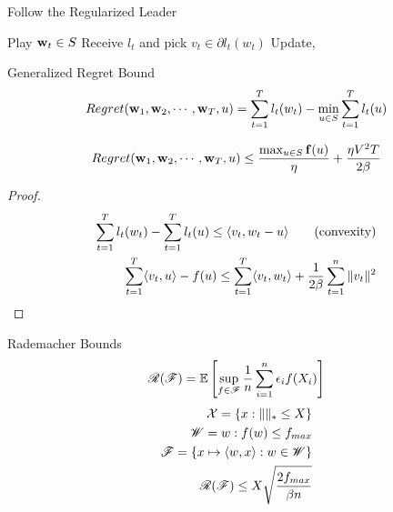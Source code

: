 \begin{frame}{Follow the Regularized Leader}
  \begin{algorithmic}
    \State Play $\operatorname{\mathbf{w}}_t \in S$
    \State Receive $l_t$ and pick $v_t \in \partial l_t(w_t)$
    \State Update,
    \EndFor
  \end{algorithmic}
\end{frame}

\begin{frame}{Generalized Regret Bound}
  \begin{align*}
    Regret(\operatorname{\mathbf{w}}_1,\operatorname{\mathbf{w}}_2,\cdots,\operatorname{\mathbf{w}}_T,u) = \sum_{t=1}^T l_t(w_t) - \min_{u \in S} \sum_{t=1}^T l_t(u)
  \end{align*}
  \begin{theorem}
    \begin{align*}    
      Regret(\operatorname{\mathbf{w}}_1,\operatorname{\mathbf{w}}_2,\cdots,\operatorname{\mathbf{w}}_T,u) \le \frac{\max_{u \in S} \operatorname{\mathbf{f}}(u)}{\eta} + \frac{\eta V^2T}{2\beta}
    \end{align*}  
  \end{theorem}
\end{frame}

\begin{frame}
  \begin{proof}
    \begin{align*}    
      \sum_{t=1}^T l_t(w_t) - \sum_{t=1}^T l_t(u) \le \langle {v_t} , {w_t - u} \rangle \tag{convexity} \\
      \sum_{t=1}^T \langle {v_t} , {u} \rangle -f(u) \le \sum_{t=1}^T \langle {v_t} , {w_t} \rangle +\frac{1}{2\beta} \sum_{t=1}^n \|v_t\|^2 \\
    \end{align*}  
  \end{proof}
\end{frame}

\begin{frame}{Rademacher Bounds}
  \begin{align*}
    \operatorname{\mathscr{R}}(\operatorname{\mathscr{F}}) = \operatorname{\mathbb{E}} \left[ \sup_{f \in \operatorname{\mathscr{F}}} \frac{1}{n}\sum_{i=1}^n \epsilon_i f(X_i) \right]
  \end{align*}
  \begin{align*}
    \operatorname{\mathcal{X}} = \{ x : \|\|_{*} \le X \} \\
    \mathscr{W} = {w : f(w) \le f_{max}} \\
    \operatorname{\mathscr{F}} = \{ x \mapsto \langle {w} , {x} \rangle : w \in \mathscr{W} \} \\
    \operatorname{\mathscr{R}}(\operatorname{\mathscr{F}}) \le X\sqrt{\frac{2f_{max}}{\beta n}}
  \end{align*}
\end{frame}

